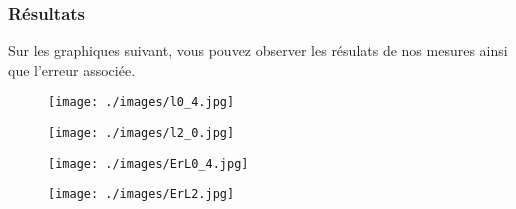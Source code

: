 \documentclass[10pt,a4paper]{article}
\begin{document}
\vspace{5mm}

\subsubsection{Résultats}

Sur les graphiques suivant, vous pouvez observer les résulats de nos mesures ainsi que l'erreur associée.\\

\vspace{5mm}

\begin{figure}[h]
\begin{minipage}{0.47\linewidth}
    	\centering
        \texttt{[image: ./images/l0\_4.jpg]}
    \end{minipage}\hfill
    \begin{minipage}[c]{.46\linewidth}
        \centering
        \texttt{[image: ./images/l2\_0.jpg]}
    \end{minipage}
\end{figure}
\vspace{5mm}
\begin{figure}[h]
		\begin{minipage}{0.46\linewidth}
    	\centering
        \texttt{[image: ./images/ErL0\_4.jpg]}
    \end{minipage}\hfill
    \begin{minipage}[c]{.46\linewidth}
        \centering
        \texttt{[image: ./images/ErL2.jpg]}
    \end{minipage}
\end{figure}
\vspace{5mm}
\end{document}
